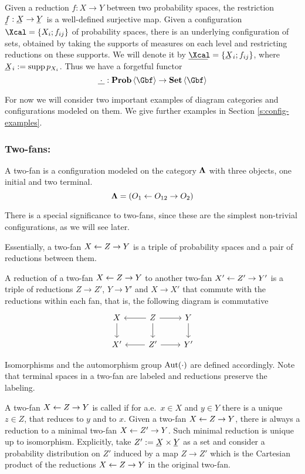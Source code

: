   Given a reduction $f:X\to Y$ between two probability spaces, the
  restriction $\un f:\un X\to\un Y$ is a well-defined surjective map.
  Given a configuration $\Xcal=\set{X_{i};f_{ij}}$ of probability
  spaces, there is an underlying configuration of sets, obtained by
  taking the supports of measures on each level and restricting
  reductions on these supports. We will denote it by
  $\un\Xcal=\set{\un X_{i};f_{ij}}$, where $\un X_{i}:=\supp
  p_{X_{i}}$. Thus we have a forgetful functor
  \[
  \underline{\mkern5mu\cdot\mkern5mu}:\prob\<\Gbf>\to\Set\<\Gbf>
  \]
  
  For now we will consider two important examples of diagram
  categories and configurations modeled on them. We give further
  examples in Section \ref{s:config-examples}.

\subsubsection{Two-fans:}\label{s:category-config-2fan}
  A two-fan is a configuration modeled on the category $\bm\Lambda$
  with three objects, one initial and two terminal.
  \[
    \bm\Lambda=(O_{1}\stackrel{}{\leftarrow} O_{12}\stackrel{}{\rightarrow} O_{2})
  \]
  
  There is a special significance to two-fans, since these are the
  simplest non-trivial configurations, as we will see later.

  Essentially, a two-fan $X\stackrel{}{\leftarrow} Z\stackrel{}{\rightarrow} Y$ is a triple of probability spaces and a pair of
  reductions  between them. 

  A reduction of a two-fan $X\stackrel{}{\leftarrow} Z\stackrel{}{\rightarrow} Y$ to another two-fan $X'\stackrel{}{\leftarrow} Z'\stackrel{}{\rightarrow} Y'$
  is a triple of reductions $Z\to Z'$, $Y\to Y'$ and $X\to X'$ that
  commute with the reductions within each fan, that is, the following diagram is commutative
  \[
  \begin{tikzcd}
  X 
  \arrow{d}
  & Z
  \arrow{l}
  \arrow{d}
  \arrow{r}
  & Y 
  \arrow{d}\\
  X' 
  & 
  Z' 
  \arrow{l}
  \arrow{r}
  & Y'  
  \end{tikzcd}
  \] 
  
  Isomorphisms and the automorphism group $\operatorname{\mathrm{Aut}}(\cdot)$
  are defined accordingly.  Note that terminal spaces in a two-fan are
  labeled and reductions preserve the labeling.
  
  A two-fan $X\stackrel{}{\leftarrow} Z\stackrel{}{\rightarrow} Y$ is called  if
  for a.e.~$x\in X$ and $y\in Y$ there is a unique $z\in Z$, that
  reduces to $y$ and to $x$.  Given a two-fan $X\stackrel{}{\leftarrow} Z\stackrel{}{\rightarrow} Y$, there is
  always a reduction to a minimal two-fan $X\stackrel{}{\leftarrow} Z'\stackrel{}{\rightarrow} Y$. Such minimal
  reduction is unique up to isomorphism. Explicitly, take $Z':=\un
  X\times \un Y$ as a set and consider a probability distribution on
  $Z'$ induced by a map $Z\to Z'$ which is the Cartesian product of
  the reductions $X\stackrel{}{\leftarrow} Z\stackrel{}{\rightarrow} Y$ in the original two-fan.

